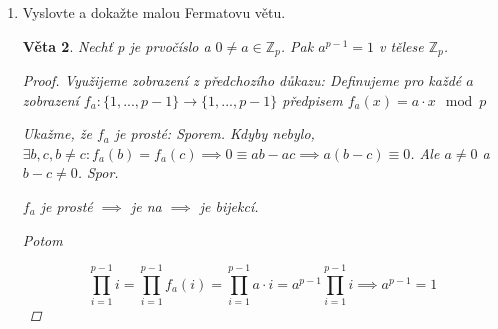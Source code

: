 \documentclass[10pt,a4paper]{article}
\theoremstyle{plain}
\newtheorem{veta}{Věta}
\begin{document}
\begin{enumerate}
\begin{veta}
\begin{proof}
\begin{enumerate}[label=(\alph*)]
\begin{itemize}
Zvolme libovolnou hranu $e$, BÚNO $e = (v_1, v_2)$.
Nechť $A = L_{G}^{1,1}$, $B = L_{G \setminus e}^{1,1}$, $C = L_{G \circ e}^{1,1}$



$A$ a $B$ jsou shodné až na $a_{1,1} - 1 = b_{1,1}$. První sloupec $A$ vyjádříme jako součet prvního sloupce $B$ a elementárního vektoru $e^1$

\[\det(A) = \det(B) + \det\left(\ \begin{array}{|c|c|}
\hline 1 & * \\  \hline  0 & C \\ \hline
\end{array} \ \right) = \det(B) + \det(C)\]

Počet koster můžeme vyjádřit rekurentním vztahem
\[ \kappa(G) = \kappa(G \setminus e) + \kappa(G \circ e) \overset{IP}{=} \det(B) + \det(C) = det(A) \]

\end{itemize}
\end{enumerate}
\end{proof}
\end{veta}

\item Vyslovte a dokažte malou Fermatovu větu.


\begin{veta}

Nechť p je prvočíslo a $0 \neq a \in \mathbb{Z}_p$. Pak $a^{p-1} = 1$ v tělese $\mathbb{Z}_p$.

\begin{proof}
Využijeme zobrazení z předchozího důkazu: 
Definujeme pro každé $a$ zobrazení $f_a: \{1, ..., p-1 \} \to \{1, ..., p-1 \}$ předpisem $f_a(x) = a \cdot x \mod p$

Ukažme, že $f_a$ je prosté: Sporem. Kdyby nebylo, $\exists b,c, b \neq c: f_a(b) = f_a(c) \implies 0 \equiv ab-ac \implies a (b-c) \equiv 0$. Ale $a \neq 0$ a $b-c \neq 0$. Spor.

$f_a$ je prosté $\implies$ je na $\implies$ je bijekcí.

Potom 

\begin{equation*}
\prod_{i=1}^{p-1} i = \prod_{i=1}^{p-1} f_a(i) = \prod_{i=1}^{p-1} a\cdot i = a^{p-1} \prod_{i=1}^{p-1} i  \implies a^{p-1} = 1
\end{equation*}
\end{proof}
\end{veta}


\end{enumerate}
\end{document}
